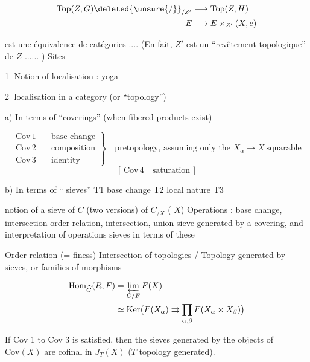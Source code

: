 \[\begin{aligned}\operatorname{Top}(Z,G)\deleted{\unsure{/}}_{/Z'}&\longrightarrow\operatorname{Top}(Z,H)\\E&\longmapsto E\times_{Z'}(X,e)\end{aligned}\]

est une équivalence de catégories .... (En fait, $Z'$ est un ``revêtement topologique'' de $Z$ ...... )
\uline{Sites}

\textcircled{1} Notion of localisation : yoga

\textcircled{2} localisation  in a category (or ``topology'')

a) In terms of ``coverings'' (when fibered products exist)

\[\left.\begin{aligned}\mathrm{Cov}\,1&\quad\text{base change}\\\mathrm{Cov}\,2&\quad\text{composition}\\\mathrm{Cov}\,3&\quad\text{identity}\end{aligned}\right\}\quad\text{pretopology, assuming only the } X_\alpha\to X\ \text{squarable}\] \[ [\,\mathrm{Cov}\,4\quad\text{saturation}\,]\]

b) In terms of `` sieves'' \quad T1 base change \quad T2 local nature \quad T3  

notion of a sieve of $C$ (two versions) of $C_{/X}$ ( $X$) Operations : base change, intersection order relation, intersection, union sieve generated by a covering, and interpretation of operations    sieves in terms of these

Order relation (= \deleted{\unsure{$\geq$}} finess) Intersection of topologies /   Topology generated by sieves, or families of morphisms 

\[\begin{aligned}\operatorname{Hom}_{\widehat C}(R,F)&=\varprojlim_{C/F}F(X)\\&\simeq\operatorname{Ker}\bigl(F(X_\alpha)\rightrightarrows\prod_{\alpha,\beta}F(X_\alpha\times X_{\beta})\bigr)\end{aligned}\]

If Cov 1 to Cov 3 is satisfied, then the  sieves generated by the objects of $\mathrm{Cov}(X)$ are cofinal in $J_T(X)$ ($T$ topology generated).

